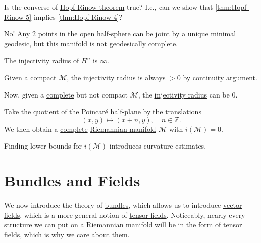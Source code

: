 \begin{problem*}
	Is the converse of \hyperref[thm:Hopf-Rinow]{Hopf-Rinow theorem} true? I.e., can we show that \autoref{thm:Hopf-Rinow-5} implies \autoref{thm:Hopf-Rinow-4}?
\end{problem*}
\begin{answer}
	No! Any \(2\) points in the open half-sphere can be joint by a unique minimal \hyperref[def:geodesic]{geodesic}, but this manifold is not \hyperref[def:geodesically-complete]{geodesically complete}.
\end{answer}

\begin{eg}
	The \hyperref[def:injectivity-radius]{injectivity radius} of \(H^n\) is \(\infty \).
\end{eg}

\begin{remark}
	Given a compact \(\mathcal{M} \), the \hyperref[def:injectivity-radius]{injectivity radius} is always \(> 0\) by continuity argument.
\end{remark}

Now, given a \hyperref[def:geodesically-complete]{complete} but not compact \(\mathcal{M} \), the \hyperref[def:injectivity-radius]{injectivity radius} can be \(0\).

\begin{eg}
	Take the quotient of the Poincaré half-plane by the translations
	\[
		(x, y) \mapsto (x+n, y),\quad n\in \mathbb{Z} .
	\]
	We then obtain a \hyperref[def:geodesically-complete]{complete} \hyperref[def:Riemannian-manifold]{Riemannian manifold} \(\mathcal{M} \) with \(i(\mathcal{M} ) = 0\).
\end{eg}

\begin{note}
	Finding lower bounds for \(i(\mathcal{M})\) introduces curvature estimates.
\end{note}

\section{Bundles and Fields}
We now introduce the theory of \hyperref[def:bundle]{bundles}, which allows us to introduce \hyperref[def:vector-field*]{vector fields}, which is a more general notion of \hyperref[def:tensor-field]{tensor fields}. Noticeably, nearly every structure we can put on a \hyperref[def:Riemannian-manifold]{Riemannian manifold} will be in the form of \hyperref[def:tensor-field]{tensor fields}, which is why we care about them.

